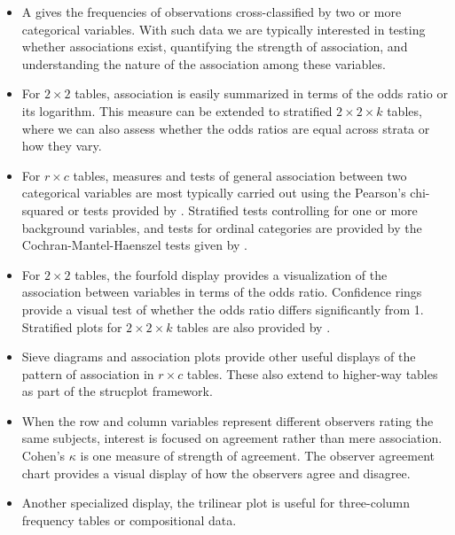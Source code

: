 \documentclass[10pt,krantz2]{krantz}\usepackage[]{graphicx}\usepackage[]{color}
\begin{document}
\begin{itemize}
  \item A \ctab gives the frequencies of observations
  cross-classified by two or more categorical variables.
  With such data we are typically interested in testing whether
  associations exist, quantifying the strength of association,
  and understanding the nature of the association among these
  variables.

  \item For $2 \times 2$ tables, association is
   easily summarized in terms of the odds ratio or its logarithm.
   This measure can be extended to stratified $2 \times 2 \times k$
   tables, where we can also assess whether the odds ratios are
   equal across strata or how they vary.

  \item For $r \times c$ tables, measures and
  tests of general association between two categorical variables are
  most typically carried out using the Pearson's chi-squared or
  \LR tests provided by .
  Stratified tests controlling for one or more background variables, and
  tests for ordinal categories are provided by the
  Cochran-Mantel-Haenszel tests given by .

  \item For $2 \times 2$ tables, the fourfold display provides a
  visualization of the association between variables in terms of
  the odds ratio.  Confidence rings provide a visual test of
  whether the odds ratio differs significantly from 1. Stratified
  plots for $2 \times 2 \times k$ tables are also provided by .

  \item Sieve diagrams and association plots provide other useful displays of the pattern of association in $r \times c$ tables.  These also extend to higher-way tables
  as part of the strucplot framework.

  \item When the row and column variables represent different
  observers rating the same subjects, interest is focused on
  agreement rather than mere association.  Cohen's $\kappa$ is one
  measure of strength of agreement.  The observer agreement chart
  provides a visual display of how the observers agree and
  disagree.

  \item Another specialized display, the trilinear plot is useful
  for three-column frequency tables or compositional data.
\end{itemize}
\end{document}
